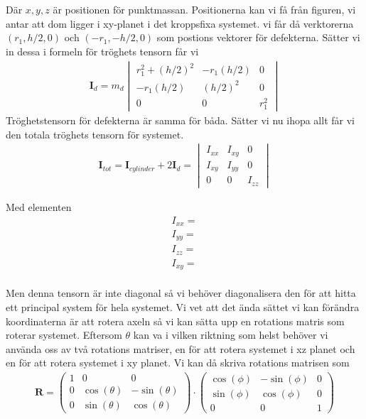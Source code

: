 \documentclass[a4paper]{article}
\begin{document}
Där $x,y,z$ är positionen för punktmassan. Positionerna kan vi få från figuren, vi antar att dom ligger i xy-planet i det kroppsfixa systemet. vi får då verktorerna $(r_1,h/2,0)$ och $(-r_1,-h/2,0)$ som postions vektorer för defekterna. Sätter vi in dessa i formeln för tröghets tensorn får vi
\begin{align*}
    \mathbf{I}_d = m_d \begin{vmatrix}
        r_1^2 + (h/2)^2 & -r_1(h/2) & 0 \\
        -r_1(h/2) & (h/2)^2 & 0 \\
        0 & 0 & r_1^2
    \end{vmatrix}
\end{align*}
Tröghetstensorn för defekterna är samma för båda. Sätter vi nu ihopa allt får vi den totala tröghets tensorn för systemet.
\begin{align*}
    \mathbf{I}_{tot} = \mathbf{I}_{cylinder} + 2\mathbf{I}_{d} = \begin{vmatrix}
        I_{xx} & I_{xy} & 0 \\
        I_{xy} & I_{yy} & 0 \\
        0 & 0 & I_{zz}
    \end{vmatrix}
\end{align*}

Med elementen
\begin{align*}
    I_{xx} = \\
    I_{yy} = \\
    I_{zz} = \\
    I_{xy} = \\
\end{align*}

Men denna tensorn är inte diagonal så vi behöver diagonalisera den för att hitta ett principal system för hela systemet. Vi vet att det ända sättet vi kan förändra koordinaterna är att rotera axeln så vi kan sätta upp en rotations matris som roterar systemet. Eftersom $\theta$ kan va i vilken riktning som helst behöver vi använda oss av två rotations matriser, en för att rotera systemet i xz planet och en för att rotera systemet i xy planet. Vi kan då skriva rotations matrisen som
\begin{align*}
    \mathbf{R} = \begin{pmatrix}
        1 & 0 & 0 \\
        0 & \cos(\theta) & -\sin(\theta) \\
        0 & \sin(\theta) & \cos(\theta)
    \end{pmatrix} \cdot
    \begin{pmatrix}
        \cos(\phi) & -\sin(\phi) & 0 \\
        \sin(\phi) & \cos(\phi) & 0 \\
        0 & 0 & 1
    \end{pmatrix}
\end{align*}
\end{document}
